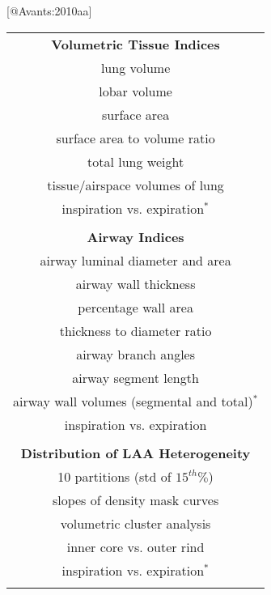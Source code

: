 [@Avants:2010aa]


\begin{table}[!t]
  \small
  \begin{minipage}{0.33 \linewidth}
   \vspace{-2mm}
   \centering
    \begin{tabular}[t]{c}
    {\bf Volumetric Tissue Indices}  \\
    \cmidrule[1pt](lr){1-1}
    lung volume   \\
    lobar volume  \\
    surface area  \\
    surface area to volume ratio  \\
    total lung weight  \\
    tissue/airspace volumes of lung \\
    inspiration vs. expiration$^*$ \\
    \\
    {\bf Airway Indices} \\
    \cmidrule[1pt](lr){1-1}
    airway luminal diameter and area  \\
    airway wall thickness  \\
    percentage wall area   \\
    thickness to diameter ratio  \\
    airway branch angles  \\
    airway segment length  \\
    airway wall volumes (segmental and total)$^*$ \\
    inspiration vs. expiration  \\
    \\
    {\bf Distribution of LAA Heterogeneity}  \\
    \cmidrule[1pt](lr){1-1}
    10 partitions (std of $15^{th} \%$)  \\
    slopes of density mask curves  \\
    volumetric cluster analysis  \cite{Zaporozhan2005} \\
    inner core vs. outer rind \cite{Nakano1999,Nakano2001}\\
    inspiration vs. expiration$^*$ \\
    \\
   \end{tabular}
   \end{minipage}
  \hspace{0cm}
  \begin{minipage}{0.33 \linewidth}

\end{minipage}
\end{table}
